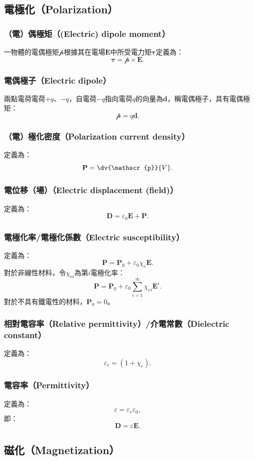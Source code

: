 \documentclass[a4paper,12pt]{report}
\begin{document}
\begin{itemize}
\subsection{電極化（Polarization）}
\subsubsection{（電）偶極矩（(Electric) dipole moment）}
一物體的電偶極矩$\mathscr{p}$根據其在電場$\mathbf{E}$中所受電力矩$\boldsymbol{\tau}$定義為：
\[\boldsymbol{\tau} = \mathscr{p} \times \mathbf{E}.\]
\subsubsection{電偶極子（Electric dipole）}
兩點電荷電荷$+q$、$-q$，自電荷$-q$指向電荷$q$的向量為$\mathbf{d}$，稱電偶極子，具有電偶極矩：
\[\mathscr{p}=q\mathbf{d}.\]
\subsubsection{（電）極化密度（Polarization current density）}
定義為：
\[\mathbf{P}=\dv{\mathscr{p}}{V}.\]
\subsubsection{電位移（場）（Electric displacement (field)）}
定義為：
\[\mathbf{D} = \varepsilon_0 \mathbf{E} + \mathbf{P}.\]
\subsubsection{電極化率/電極化係數（Electric susceptibility）}
定義為：
\[\mathbf{P}=\mathbf{P}_0+\varepsilon_0\chi_e\mathbf{E}.\]
對於非線性材料，令$\chi_{ei}$為第$i$電極化率：
\[\mathbf{P}=\mathbf{P}_0+\varepsilon_0\sum_{i=1}^{\infty}\chi_{ei}\mathbf{E}^i.\]
對於不具有鐵電性的材料，$\mathbf{P}_0=0$。
\subsubsection{相對電容率（Relative permittivity）/介電常數（Dielectric constant）}
定義為：
\[\varepsilon_r=(1+\chi_e).\]
\subsubsection{電容率（Permittivity）}
定義為：
\[\varepsilon=\varepsilon_r\varepsilon_0,\]
即：
\[\mathbf{D} = \varepsilon\mathbf{E}.\]
\subsection{磁化（Magnetization）}

\end{itemize}
\end{document}
